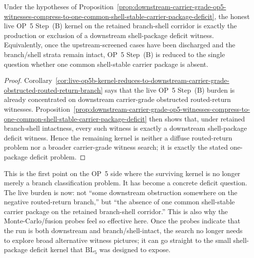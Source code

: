 \begin{corollary}
\label{cor:live-op5b-kernel-reduces-to-one-common-shell-stable-carrier-package-deficit-problem}
Under the hypotheses of Proposition~\ref{prop:downstream-carrier-grade-op5-witnesses-compress-to-one-common-shell-stable-carrier-package-deficit}, the honest live OP~5 Step~(B) kernel on the retained branch-shell corridor is exactly the production or exclusion of a downstream shell-package deficit witness. Equivalently, once the upstream-screened cases have been discharged and the branch/shell strata remain intact, OP~5 Step~(B) is reduced to the single question whether one common shell-stable carrier package is absent.
\end{corollary}

\begin{proof}
Corollary~\ref{cor:live-op5b-kernel-reduces-to-downstream-carrier-grade-obstructed-routed-return-branch} says that the live OP~5 Step~(B) burden is already concentrated on downstream carrier-grade obstructed routed-return witnesses. Proposition~\ref{prop:downstream-carrier-grade-op5-witnesses-compress-to-one-common-shell-stable-carrier-package-deficit} then shows that, under retained branch-shell intactness, every such witness is exactly a downstream shell-package deficit witness. Hence the remaining kernel is neither a diffuse routed-return problem nor a broader carrier-grade witness search; it is exactly the stated one-package deficit problem.
\end{proof}

\begin{remark}
\label{rem:what-fifth-op5b-sharpening-buys}
This is the first point on the OP~5 side where the surviving kernel is no longer merely a branch classification problem. It has become a concrete deficit question. The live burden is now: not ``some downstream obstruction somewhere on the negative routed-return branch,'' but ``the absence of one common shell-stable carrier package on the retained branch-shell corridor.'' This is also why the Monte-Carlo/fusion probes feel so effective here. Once the probes indicate that the run is both downstream and branch/shell-intact, the search no longer needs to explore broad alternative witness pictures; it can go straight to the small shell-package deficit kernel that \(\mathrm{BL}_5\) was designed to expose.
\end{remark}





